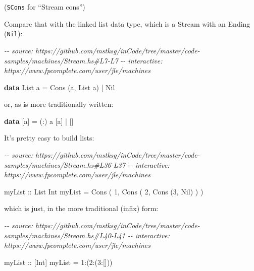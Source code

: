 \documentclass[]{article}
\newenvironment{Shaded}{}{}
\newcommand{\CommentTok}[1]{\textcolor[rgb]{0.38,0.63,0.69}{\textit{#1}}}
\newcommand{\DataTypeTok}[1]{\textcolor[rgb]{0.56,0.13,0.00}{#1}}
\newcommand{\DecValTok}[1]{\textcolor[rgb]{0.25,0.63,0.44}{#1}}
\newcommand{\KeywordTok}[1]{\textcolor[rgb]{0.00,0.44,0.13}{\textbf{#1}}}
\newcommand{\NormalTok}[1]{#1}
\newcommand{\OperatorTok}[1]{\textcolor[rgb]{0.40,0.40,0.40}{#1}}
\newcommand{\OtherTok}[1]{\textcolor[rgb]{0.00,0.44,0.13}{#1}}
\begin{document}
(\texttt{SCons} for ``Stream cons'')

Compare that with the linked list data type, which is a Stream with an Ending
(\texttt{Nil}):

\begin{Shaded}
\begin{Highlighting}[]
\CommentTok{{-}{-} source: https://github.com/mstksg/inCode/tree/master/code{-}samples/machines/Stream.hs\#L7{-}L7}
\CommentTok{{-}{-} interactive: https://www.fpcomplete.com/user/jle/machines}

\KeywordTok{data} \DataTypeTok{List}\NormalTok{ a }\OtherTok{=} \DataTypeTok{Cons}\NormalTok{ (a, }\DataTypeTok{List}\NormalTok{ a) }\OperatorTok{|} \DataTypeTok{Nil}
\end{Highlighting}
\end{Shaded}

or, as is more traditionally written:

\begin{Shaded}
\begin{Highlighting}[]
\KeywordTok{data}\NormalTok{ [a] }\OtherTok{=}\NormalTok{ (}\OperatorTok{:}\NormalTok{) a [a] }\OperatorTok{|}\NormalTok{ []}
\end{Highlighting}
\end{Shaded}

It's pretty easy to build lists:

\begin{Shaded}
\begin{Highlighting}[]
\CommentTok{{-}{-} source: https://github.com/mstksg/inCode/tree/master/code{-}samples/machines/Stream.hs\#L36{-}L37}
\CommentTok{{-}{-} interactive: https://www.fpcomplete.com/user/jle/machines}

\OtherTok{myList ::} \DataTypeTok{List} \DataTypeTok{Int}
\NormalTok{myList }\OtherTok{=} \DataTypeTok{Cons}\NormalTok{ ( }\DecValTok{1}\NormalTok{, }\DataTypeTok{Cons}\NormalTok{ ( }\DecValTok{2}\NormalTok{, }\DataTypeTok{Cons}\NormalTok{ (}\DecValTok{3}\NormalTok{, }\DataTypeTok{Nil}\NormalTok{) ) )}
\end{Highlighting}
\end{Shaded}

which is just, in the more traditional (infix) form:

\begin{Shaded}
\begin{Highlighting}[]
\CommentTok{{-}{-} source: https://github.com/mstksg/inCode/tree/master/code{-}samples/machines/Stream.hs\#L40{-}L41}
\CommentTok{{-}{-} interactive: https://www.fpcomplete.com/user/jle/machines}

\OtherTok{myList\textquotesingle{} ::}\NormalTok{ [}\DataTypeTok{Int}\NormalTok{]}
\NormalTok{myList\textquotesingle{} }\OtherTok{=} \DecValTok{1}\OperatorTok{:}\NormalTok{(}\DecValTok{2}\OperatorTok{:}\NormalTok{(}\DecValTok{3}\OperatorTok{:}\NormalTok{[]))}
\end{Highlighting}
\end{Shaded}
\end{document}
